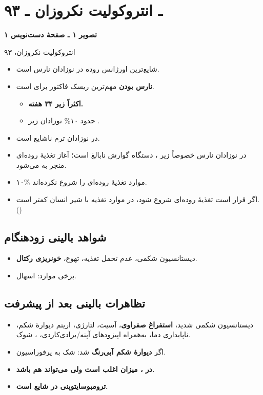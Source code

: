 \documentclass[12pt,a4paper]{article}
\begin{document}
\fi

\section*{۹۳ ـ انتروکولیت نکروزان ـ }
\noindent\textbf{تصویر ۱ ـ صفحهٔ دست‌نویس ۱}\par
{\footnotesize{}\quad انتروکولیت نکروزان، ۹۳\par
{}\par}

\begin{itemize}
\item شایع‌ترین اورژانس روده در نوزادان نارس است.
\item \textbf{نارس بودن} مهم‌ترین ریسک فاکتور برای  است.
  \begin{itemize}
  \item \textbf{اکثراً زیر ۳۴ هفته.}
  \item حدود ۱۰\% نوزادان زیر .
  \end{itemize}
\item {} در نوزادان ترم ناشایع است.
\item در نوزادان نارس خصوصاً زیر ، دستگاه گوارش نابالغ است؛ آغاز تغذیهٔ روده‌ای منجر به  می‌شود.
\item ۱۰\% موارد  تغذیهٔ روده‌ای را شروع نکرده‌اند.
\item اگر قرار است تغذیهٔ روده‌ای شروع شود،  در موارد تغذیه با شیر انسان کمتر است. (\lr{!})
\end{itemize}

\subsection*{شواهد بالینی زودهنگام }
\begin{itemize}
\item دیستانسیون شکمی، عدم تحمل تغذیه، تهوع، \textbf{خونریزی رکتال}.
\item برخی موارد: اسهال.
\end{itemize}

\subsection*{تظاهرات بالینی بعد از پیشرفت }
\begin{itemize}
\item دیستانسیون شکمی شدید، \textbf{استفراغ صفراوی}، آسیت، لتارژی، اریتم دیوارهٔ شکم، ناپایداری دما، به‌همراه اپیزودهای آپنه/برادی‌کاردی، \textbf{}، شوک.
\item اگر \textbf{دیوارهٔ شکم آبی‌رنگ} شد: شک به پرفوراسیون.
\item \textbf{در ، میزان  اغلب \lr{\(\downarrow\)} است ولی می‌تواند \lr{\(\uparrow\)} هم باشد.}
\item \textbf{ترومبوسایتوپنی در  شایع است.}
\end{itemize}
\end{document}

